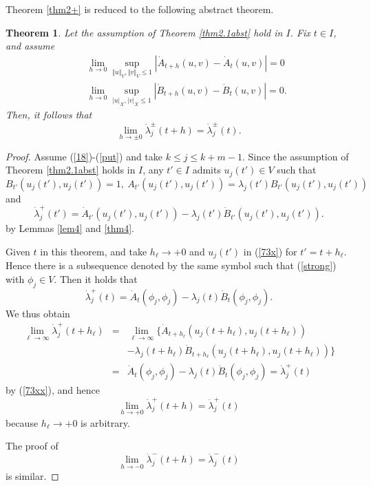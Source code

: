 \documentclass[final,a4paper]{jmsj}
\theoremstyle{thmstyleone}%
\newtheorem{theorem}{Theorem}
\theoremstyle{thmstyletwo}%
\theoremstyle{thmstylethree}%
\begin{document}
Theorem \ref{thm2+} is reduced to the following abstract theorem. 

\begin{theorem}\label{abstconti}
Let the assumption of Theorem \ref{thm2.1abst} hold in $I$. Fix $t\in I$, and assume  
\begin{eqnarray} 
& & \lim_{h\rightarrow 0}\sup_{\Vert u\Vert_V, \Vert v\Vert_V\leq 1}\left\vert \dot A_{t+h}(u,v)-\dot A_t(u,v)\right\vert=0 \nonumber\\ 
& & \lim_{h\rightarrow 0}\sup_{\vert u\vert_X, \vert v\vert_X\leq 1}\left \vert \dot B_{t+h}(u,v)-\dot B_t(u,v)\right\vert=0.   
 \label{72x}
\end{eqnarray} 
Then, it follows that  
\[ \lim_{h\rightarrow \pm 0}\dot \lambda_j^\pm(t+h)=\dot \lambda_j^\pm (t). \] 
\end{theorem} 

\begin{proof} 
Assume (\ref{18})-(\ref{put}) and take $k\leq j\leq k+m-1$. Since the assumption of Theorem \ref{thm2.1abst} holds in $I$, any $t'\in I$ admits $u_j(t')\in V$ such that  
\begin{equation} 
B_{t'}(u_j(t'), u_j(t'))=1, \ A_{t'}(u_j(t'), u_j(t'))=\lambda_j(t')B_{t'}(u_j(t'), u_j(t'))  
 \label{73x}
\end{equation} 
and 
\begin{equation} 
\dot \lambda_j^+(t')=\dot A_{t'}(u_j(t'), u_j(t'))-\lambda_j(t')\dot B_{t'}(u_j(t'), u_j(t')).  
 \label{73xx}
\end{equation} 
by Lemmas \ref{lem4} and \ref{thm4}. 

Given $t$ in this theorem, and take $h_\ell\rightarrow +0$ and $u_j(t')$ in (\ref{73x}) for $t'=t+h_\ell$.  Hence  there is a subsequence denoted by the same symbol such that (\ref{strong}) with $\phi_j\in V$. Then it holds that    
\[ \dot\lambda_j^+(t)=\dot A_t(\phi_j, \phi_j)-\lambda_j(t)\dot B_t(\phi_j, \phi_j). \] 
We thus obtain 
\begin{eqnarray*} 
\lim_{\ell\rightarrow \infty}
\dot \lambda_j^+(t+h_\ell) & = & \lim_{\ell\rightarrow \infty}
\{ \dot A_{t+h_\ell}(u_j(t+h_\ell), u_j(t+h_\ell)) \\ 
& & -\lambda_j(t+h_\ell)\dot B_{t+h_\ell}(u_j(t+h_\ell), u_j(t+h_\ell)) \} \\ 
& = & \dot  A_t(\phi_j, \phi_j)-\lambda_j(t)\dot B_t(\phi_j, \phi_j)=\dot \lambda_j^+(t) 
\end{eqnarray*} 
by (\ref{73xx}), and hence 
\[ \lim_{h\rightarrow +0}\dot \lambda_j^+(t+h)=\dot \lambda_j^+(t) \] 
because $h_\ell\rightarrow +0$ is arbitrary. 

The proof of 
\[ \lim_{h\rightarrow -0}\dot \lambda_j^-(t+h)=\dot \lambda_j^-(t) \] 
is similar. \end{proof} 
\end{document}
